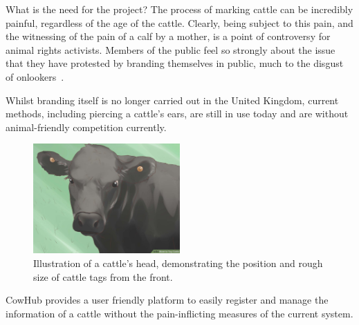 
\begin{subsection}{What is the need for the project?}
  The process of marking cattle can be incredibly painful, regardless of the age of the cattle. Clearly, being subject to this pain, and the witnessing of the pain of a calf by a mother, is a point of controversy for animal rights activists. Members of the public feel so strongly about the issue that they have protested by branding themselves in public, much to the disgust of onlookers~\cite{theguardian1}. 
  
  Whilst branding itself is no longer carried out in the United Kingdom, current methods, including piercing a cattle's ears, are still in use today and are without animal-friendly competition currently. 

  \begin{figure}[H]
  	\centering
    \includegraphics[width=0.5\textwidth]{images/cattle-with-ear-tag.jpg}
  	\caption[Cattle ear tagging]{
      Illustration of a cattle's head, demonstrating the position and rough size of cattle tags from the front. \cite{wikihow1}
  	}
  \end{figure}
  
  CowHub provides a user friendly platform to easily register and manage the information of a cattle without the pain-inflicting measures of the current system.

\end{subsection}
